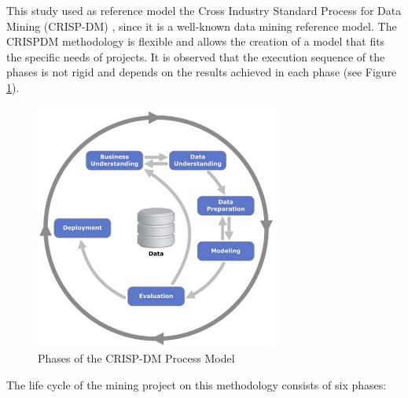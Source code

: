 This study used as reference model the Cross Industry Standard Process for Data Mining (CRISP-DM) \cite{chapman2000crisp}, since it is a well-known data mining reference model. The CRISPDM methodology is flexible and allows the creation of a model that fits the specific needs of projects. It is observed that the execution sequence of the phases is not rigid and depends on the results achieved in each phase (see Figure \ref{fig1}).

\begin{figure}[htbp]
	\centerline{
		\includegraphics[width=80mm,scale=0.8]{assets/crispdm.jpg}
	}
	\caption{Phases of the CRISP-DM Process Model}
	\label{fig1}
\end{figure}

The life cycle of the mining project on this methodology consists of six phases: 

